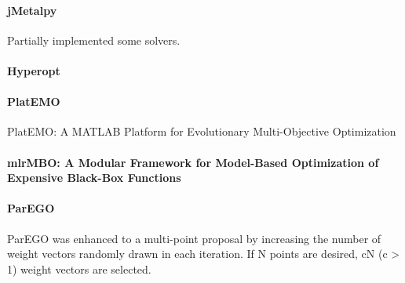     \paragraph{jMetalpy} \cite{benitezhidalgo2019jmetalpy}
    Partially implemented some solvers.

    \paragraph{Hyperopt}

    \paragraph{PlatEMO} \cite{PlatEMO}
    PlatEMO: A MATLAB Platform for Evolutionary Multi-Objective Optimization

    \paragraph{mlrMBO: A Modular Framework for Model-Based Optimization of Expensive Black-Box Functions}

    \paragraph{ParEGO}
    ParEGO was enhanced to a multi-point proposal by increasing the number of weight vectors randomly drawn in each iteration. If N points are desired, cN (c > 1) weight vectors are selected. 
